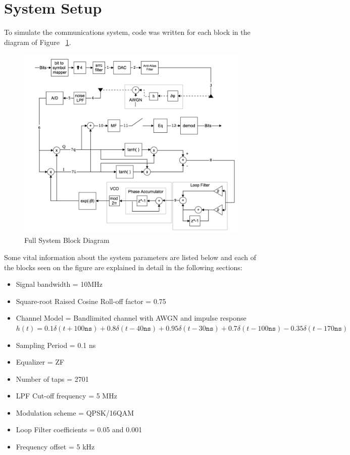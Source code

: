 \documentclass[]{article}
\begin{document}
\newpage
\section{System Setup}
\label{sec:setup}
To simulate the communications system, code was written for each block in the diagram of Figure ~\ref{fig:system}.
 
\begin{figure}[H]
\centering
\includegraphics[width=\textwidth]{systemfinal.png}
\caption{Full System Block Diagram\label{fig:system}}
\end{figure}

Some vital information about the system parameters are listed below and each of the blocks seen on the figure are explained in detail in the following sections:
\begin{itemize}
\item Signal bandwidth = 10MHz
\item Square-root Raised Cosine Roll-off factor = 0.75
\item Channel Model = Bandlimited channel with AWGN and impulse response   $h(t) = 0.1\delta(t + 100 \mathtt{ns}) + 0.8\delta(t -40 \mathtt{ns}) + 0.95\delta(t - 30 \mathtt{ns}) + 0.7\delta(t - 100 \mathtt{ns}) - 0.35\delta(t - 170 \mathtt{ns})  $
\item Sampling Period = 0.1 ns
\item Equalizer = ZF
\item Number of taps = 2701
\item LPF Cut-off frequency = 5 MHz
\item Modulation scheme = QPSK/16QAM
\item Loop Filter coefficients = 0.05 and 0.001
\item Frequency offset = 5 kHz
\end{itemize}
\end{document}
